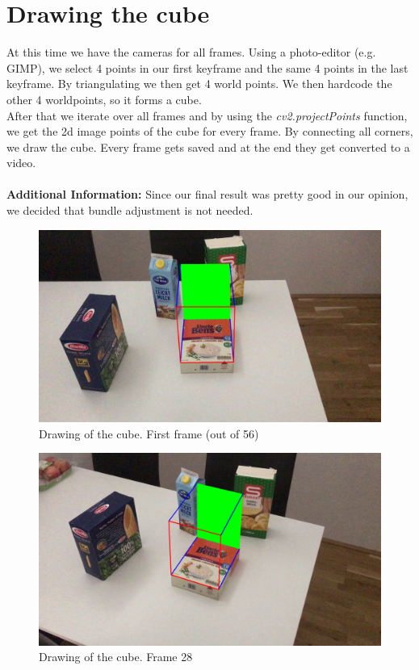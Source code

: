 \documentclass[paper=a4, fontsize=11pt]{scrartcl}
\numberwithin{equation}{section}		%
\numberwithin{figure}{section}			%
\numberwithin{table}{section}				%
\begin{document}
\section*{Drawing the cube}
At this time we have the cameras for all frames. Using a photo-editor (e.g. GIMP), we select 4 points in our first keyframe and the same 4 points in the last keyframe. By triangulating we then get 4 world points. We then hardcode the other 4 worldpoints, so it forms a cube.\\After that we iterate over all frames and by using the \emph{cv2.projectPoints} function, we get the 2d image points of the cube for every frame. By connecting all corners, we draw the cube. Every frame gets saved and at the end they get converted to a video.\\\\\textbf{Additional Information:} Since our final result was pretty good in our opinion, we decided that bundle adjustment is not needed.

\begin{figure}[h!]
\centering
\includegraphics[width=1\textwidth]{img/firstframe}
\caption{Drawing of the cube. First frame (out of 56)}
\end{figure}

\begin{figure}[h!]
\centering
\includegraphics[width=1\textwidth]{img/frame28}
\caption{Drawing of the cube. Frame 28}
\end{figure}
\end{document}
